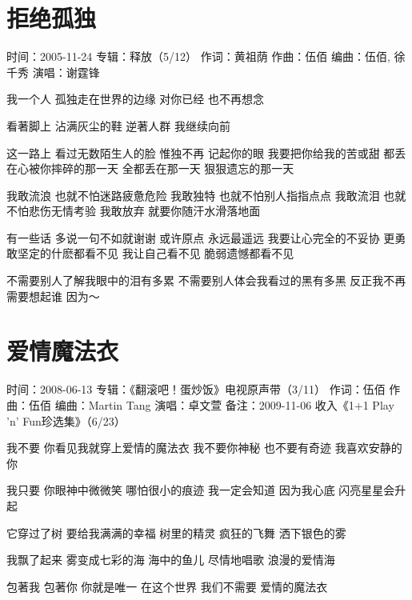 \documentclass[UTF8,a4paper,oneside,twocolumn,12pt]{ctexbook}
\newcommand{\infopair}[2]{\textbullet #1：#2}
\newcommand{\zc}[1][伍佰]{\infopair{作词}{#1}}
\newcommand{\zq}[1][伍佰]{\infopair{作曲}{#1}}
\newcommand{\bq}[1][伍佰]{\infopair{编曲}{#1}}
\newcommand{\zj}[1]{\infopair{专辑}{#1}}
\newcommand{\sj}[1]{\infopair{时间}{#1}}
\newcommand{\bz}[1]{\infopair{备注}{#1}}
\newenvironment{info}{\begin{flushleft}\kaishu
	}
	{\end{flushleft}\normalsize\yahei\par}
\newenvironment{lyric}{
	}
{}
\begin{document}
\section{拒绝孤独}
\begin{info}%
	\sj{2005-11-24}
	\zj{释放（5/12）}
	\zc[黄祖荫]
	\zq
	\bq[伍佰, 徐千秀]
	\infopair{演唱}{谢霆锋}
\end{info}
\begin{lyric}
	我一个人 孤独走在世界的边缘
	对你已经 也不再想念

	看著脚上 沾满灰尘的鞋
	逆著人群 我继续向前

	这一路上 看过无数陌生人的脸
	惟独不再 记起你的眼
	我要把你给我的苦或甜
	都丢在心被你摔碎的那一天
	全都丢在那一天 狠狠遗忘的那一天

	我敢流浪 也就不怕迷路疲惫危险
	我敢独特 也就不怕别人指指点点
	我敢流泪 也就不怕悲伤无情考验
	我敢放弃 就要你随汗水滑落地面

	有一些话 多说一句不如就谢谢
	或许原点 永远最遥远
	我要让心完全的不妥协
	更勇敢坚定的什麽都看不见
	我让自己看不见 脆弱遗憾都看不见

	不需要别人了解我眼中的泪有多累
	不需要别人体会我看过的黑有多黑
	反正我不再需要想起谁 因为～
\end{lyric}

\section{爱情魔法衣}
\begin{info}
	\sj{2008-06-13}
	\zj{《翻滚吧！蛋炒饭》电视原声带（3/11）}
	\zc
	\zq
	\bq[Martin Tang]
	\infopair{演唱}{卓文萱}
	\bz{2009-11-06 收入《1+1 Play 'n' Fun珍选集》（6/23）}
\end{info}
\begin{lyric}
	我不要 你看见我就穿上爱情的魔法衣
	我不要你神秘 也不要有奇迹 我喜欢安静的你

	我只要 你眼神中微微笑 哪怕很小的痕迹
	我一定会知道 因为我心底 闪亮星星会升起

	它穿过了树 要给我满满的幸福
	树里的精灵 疯狂的飞舞 洒下银色的雾

	我飘了起来 雾变成七彩的海
	海中的鱼儿 尽情地唱歌 浪漫的爱情海

	包著我 包著你 你就是唯一
	在这个世界 我们不需要 爱情的魔法衣
\end{lyric}
\end{document}
